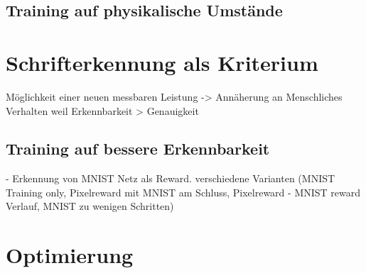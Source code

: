 \subsection*{Training auf physikalische Umstände}



\section{Schrifterkennung als Kriterium}
Möglichkeit einer neuen messbaren Leistung
-> Annäherung an Menschliches Verhalten weil Erkennbarkeit > Genauigkeit


\subsection*{Training auf bessere Erkennbarkeit}
- Erkennung von MNIST Netz als Reward. 
verschiedene Varianten (MNIST Training only, Pixelreward mit MNIST am Schluss, Pixelreward - MNIST reward Verlauf, MNIST zu wenigen Schritten)


\section{Optimierung}
